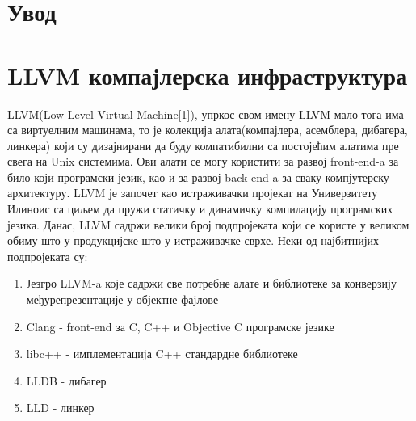 \documentclass[12pt,oneside]{memoir}
\begin{document}
\frontmatter
\naslovna
\komisija
\tableofcontents*

\mainmatter

\chapter{Увод}
\chapter{LLVM компајлерска инфраструктура}
\label{chp:LLVM}

LLVM({\lat Low Level Virtual Machine}[1]), упркос свом имену LLVM мало тога има са
виртуелним машинама, то је колекција алата(компајлера, асемблера, дибагера, линкера)
који су дизајнирани да буду компатибилни са постојећим алатима пре свега на 
Unix системима.
Ови алати  се могу користити за развој front-end-a за било који програмски језик, 
као и за развој back-end-a за сваку компјутерску архитектуру.
LLVM је започет као истраживачки пројекат на Универзитету Илиноис са циљем да 
пружи статичку и динамичку компилацију програмских језика. 
Данас, LLVM садржи велики број подпројеката који се користе у великом обиму 
што у продукцијске што у истраживачке сврхе.
\newline Неки од најбитнијих подпројеката су:
\begin{enumerate}
\item Језгро LLVM-a које садржи све потребне алате и библиотеке за конверзију
међурепрезентације у објектне фајлове 
\item Clang - front-end за  C, C++ и Objective C програмске језике
\item libc++ - имплементација C++ стандардне библиотеке
\item LLDB - дибагер
\item LLD - линкер
\end{enumerate}
\end{document}
